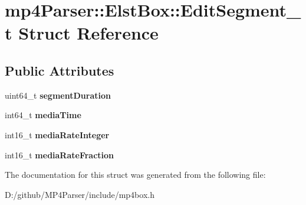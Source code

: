 \hypertarget{structmp4_parser_1_1_elst_box_1_1_edit_segment__t}{}\section{mp4\+Parser\+::Elst\+Box\+::Edit\+Segment\+\_\+t Struct Reference}
\label{structmp4_parser_1_1_elst_box_1_1_edit_segment__t}
\subsection*{Public Attributes}
\begin{DoxyCompactItemize}
\item 
\mbox{\label{structmp4_parser_1_1_elst_box_1_1_edit_segment__t_aa33a03ce7b85cb1160c6221f487f501f}} 
uint64\+\_\+t {\bfseries segment\+Duration}
\item 
\mbox{\label{structmp4_parser_1_1_elst_box_1_1_edit_segment__t_a04e5efdc95188c0ea659fc711c628e94}} 
int64\+\_\+t {\bfseries media\+Time}
\item 
\mbox{\label{structmp4_parser_1_1_elst_box_1_1_edit_segment__t_a11dd312c74928be2070b0a7523c41868}} 
int16\+\_\+t {\bfseries media\+Rate\+Integer}
\item 
\mbox{\label{structmp4_parser_1_1_elst_box_1_1_edit_segment__t_a021e5548d89b179b90fc2b8a0a5201fb}} 
int16\+\_\+t {\bfseries media\+Rate\+Fraction}
\end{DoxyCompactItemize}


The documentation for this struct was generated from the following file\+:\begin{DoxyCompactItemize}
\item 
D\+:/github/\+M\+P4\+Parser/include/mp4box.\+h\end{DoxyCompactItemize}

